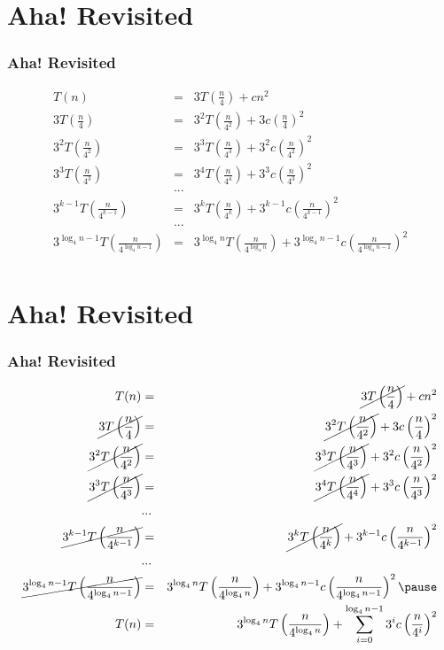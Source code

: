 \documentclass{beamer}
\newcommand{\sect}[1]{
\section{#1}
\begin{frame}[fragile]\frametitle{#1}
}
\begin{document}
\sect{{\bf Aha!} Revisited}
\begin{eqnarray*}
T(n) &=& 3T\left(\frac{n}{4}\right)+ cn^2\\
3T\left(\frac{n}{4}\right) &=& 3^2T\left(\frac{n}{4^2}\right)  + 3c\left(\frac{n}{4}\right)^2\\
3^2T\left(\frac{n}{4^2}\right) &=& 3^3T\left(\frac{n}{4^3}\right)  + 3^2c\left(\frac{n}{4^2}\right)^2\\
3^3T\left(\frac{n}{4^3}\right) &=& 3^4T\left(\frac{n}{4^4}\right)  + 3^3c\left(\frac{n}{4^3}\right)^2\\
&...&\\
3^{k-1}T\left(\frac{n}{4^{k-1}}\right) &=& 3^{k}T\left(\frac{n}{4^{k}}\right)  + 3^{k-1}c\left(\frac{n}{4^{k-1}}\right)^2\\
&...&\\
3^{\log_4 n-1}T\left(\frac{n}{4^{\log_4 n-1}}\right) &=& 3^{\log_4 n}T\left(\frac{n}{4^{\log_4 n}}\right)  + 3^{\log_4 n-1}c\left(\frac{n}{4^{\log_4 n-1}}\right)^2\\
\end{eqnarray*}
\end{frame}

\sect{{\bf Aha!} Revisited}
\begin{eqnarray*}
T(n) &=& \cancel{3T\left(\frac{n}{4}\right)}+ cn^2\\
\cancel{3T\left(\frac{n}{4}\right)} &=& \cancel{3^2T\left(\frac{n}{4^2}\right) } + 3c\left(\frac{n}{4}\right)^2\\
\cancel{3^2T\left(\frac{n}{4^2}\right)} &=& \cancel{3^3T\left(\frac{n}{4^3}\right)}  + 3^2c\left(\frac{n}{4^2}\right)^2\\
\cancel{3^3T\left(\frac{n}{4^3}\right)} &=& \cancel{3^4T\left(\frac{n}{4^4}\right)}  + 3^3c\left(\frac{n}{4^3}\right)^2\\
&...&\\
\cancel{3^{k-1}T\left(\frac{n}{4^{k-1}}\right)} &=& \cancel{3^{k}T\left(\frac{n}{4^{k}}\right)}  + 3^{k-1}c\left(\frac{n}{4^{k-1}}\right)^2\\
&...&\\
\cancel{3^{\log_4 n-1}T\left(\frac{n}{4^{\log_4 n-1}}\right)} &=& 3^{\log_4 n}T\left(\frac{n}{4^{\log_4 n}}\right)  + 3^{\log_4 n-1}c\left(\frac{n}{4^{\log_4 n-1}}\right)^2\pause\\
T(n) &=&3^{\log_4 n}T\left(\frac{n}{4^{\log_4 n}}\right)  + \sum_{i=0}^{\log_4 n-1}3^{i}c\left(\frac{n}{4^{i}}\right)^2\\
\end{eqnarray*}
\end{frame}
\end{document}
